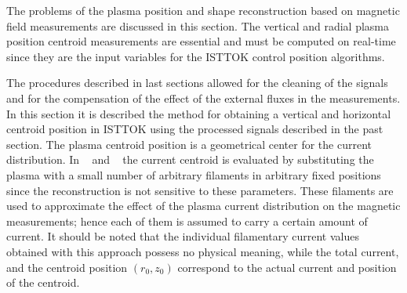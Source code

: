 The problems of the plasma position and shape reconstruction based on magnetic field measurements are discussed in this section. The vertical and radial plasma position centroid measurements are essential and must be computed on real-time since they are the input variables for the ISTTOK control position algorithms.\smallskip

The procedures described in last sections allowed for the cleaning of the signals and for the compensation of the effect of the external fluxes in the measurements. In this section it is described the method for obtaining a vertical and horizontal centroid position in ISTTOK using the processed signals described in the past section.  The plasma centroid position  is a geometrical center for the current distribution. In ~\cite{Pironti1995} and ~\cite{Swain1982}  the current centroid is evaluated  by substituting the plasma with a small number of arbitrary filaments in arbitrary fixed positions since the reconstruction is not sensitive to these parameters. These filaments are used to approximate the effect of the plasma current distribution on the magnetic measurements; hence each of them is assumed to carry a certain amount of current. It should be noted that the individual filamentary current values obtained with this approach possess no physical meaning, while the total current, and the centroid position $(r_0,z_0)$ correspond to the actual current and position of the centroid.\smallskip
